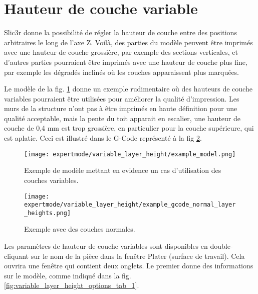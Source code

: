 
\section{Hauteur de couche variable} %
\label{sec:variable_layer_height}

Slic3r donne la possibilit\'e de r\'egler la hauteur de couche entre des positions arbitraires le long de l'axe Z. Voil\`a, des parties du mod\`ele peuvent \^etre imprim\'es avec une hauteur de couche grossi\`ere, par exemple des sections verticales, et d'autres parties pourraient \^etre imprim\'es avec une hauteur de couche plus fine, par exemple les d\'egrad\'es inclin\'es o\`u les couches apparaissent plus marqu\'ees.

Le mod\`ele de la fig. \ref{fig:example_model} donne un exemple rudimentaire o\`u des hauteurs de couche variables pourraient \^etre utilis\'ees pour am\'eliorer la qualit\'e d'impression.  Les murs de la structure n'ont pas \`a \^etre imprim\'es en haute d\'efinition pour une qualit\'e acceptable, mais la pente du toit apparait en escalier, une hauteur de couche de 0,4 mm est trop grossi\`ere, en particulier pour la couche sup\'erieure, qui est aplatie.  Ceci est illustr\'e dans le G-Code repr\'esent\'e \`a la fig \ref{fig:example_gcode_normal_layer_heights}.


\begin{figure}[H]
\centering
\texttt{[image: expertmode/variable\_layer\_height/example\_model.png]}
\caption{Exemple de mod\`ele mettant en evidence un cas d'utilisation des couches variables.}
\label{fig:example_model}
\end{figure}

\begin{figure}[H]
\centering
\texttt{[image: expertmode/variable\_layer\_height/example\_gcode\_normal\_layer\_heights.png]}
\caption{Exemple avec des couches normales.}
\label{fig:example_gcode_normal_layer_heights}
\end{figure}

Les param\`etres de hauteur de couche variables sont disponibles en double-cliquant sur ​​le nom de la pi\`ece dans la fen\^etre Plater (surface de travail).  Cela ouvrira une fen\^etre qui contient deux onglets. Le premier donne des informations sur le mod\`ele, comme indiqu\'e dans la fig. \ref{fig:variable_layer_height_options_tab_1}.

